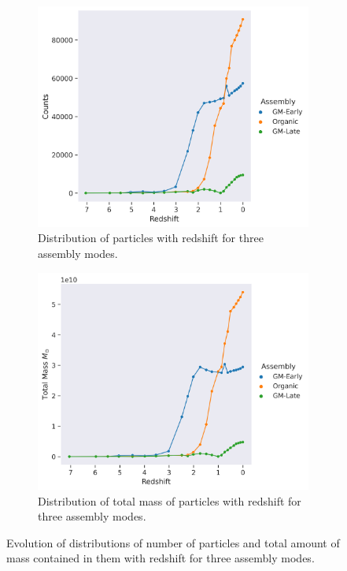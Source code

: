 \documentclass{article}
\begin{document}
	
	\begin{figure}
		\centering
		\begin{subfigure} {.5\columnwidth}
				\centering 
				\includegraphics[width=\columnwidth]{../plots/particle_distribution_wrt_redshift.png}
				\caption{Distribution of particles with redshift for three assembly modes.}
		\end{subfigure}
			\hfill
		\begin{subfigure} {.45\columnwidth}
				\centering 
				\includegraphics[width=\columnwidth]{../plots/total_mass_wrt_redshift.png}
				\caption{Distribution of total mass of particles with redshift for three assembly modes.}
		\end{subfigure}
		\caption{Evolution of distributions of number of particles and total amount of mass contained in them with redshift for three assembly modes.}
	\end{figure}
\end{document}
